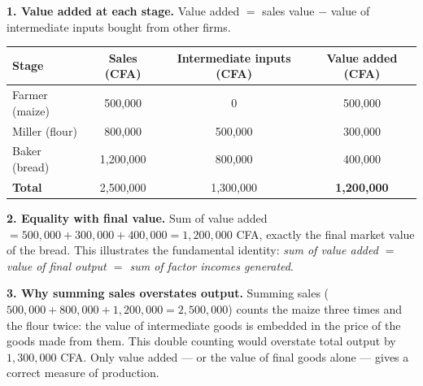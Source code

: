 \documentclass[11pt]{article}
\newcommand{\cle}[1]{{\popxbold\color{popdark}#1}}
\begin{document}
\begin{corrige}
\textbf{1. Value added at each stage.} Value added $=$ sales value $-$ value of intermediate inputs bought from other firms.
\begin{center}
\begin{tabular}{|l|c|c|c|}
\hline
\rowcolor{popblueL} \textbf{Stage} & \textbf{Sales (CFA)} & \textbf{Intermediate inputs (CFA)} & \textbf{Value added (CFA)} \\
\hline
Farmer (maize) & 500,000 & 0 & 500,000 \\
\hline
Miller (flour) & 800,000 & 500,000 & 300,000 \\
\hline
Baker (bread) & 1,200,000 & 800,000 & 400,000 \\
\hline
\textbf{Total} & 2,500,000 & 1,300,000 & \textbf{1,200,000} \\
\hline
\end{tabular}
\end{center}

\textbf{2. Equality with final value.} Sum of value added $= 500{,}000 + 300{,}000 + 400{,}000 = 1{,}200{,}000$ CFA, exactly the final market value of the bread. This illustrates the fundamental identity: \emph{sum of value added $=$ value of final output $=$ sum of factor incomes generated}.

\textbf{3. Why summing sales overstates output.} Summing sales ($500{,}000 + 800{,}000 + 1{,}200{,}000 = 2{,}500{,}000$) counts the maize three times and the flour twice: the value of intermediate goods is embedded in the price of the goods made from them. This \cle{double counting} would overstate total output by $1{,}300{,}000$ CFA. Only value added — or the value of final goods alone — gives a correct measure of production.
\end{corrige}
\end{document}
